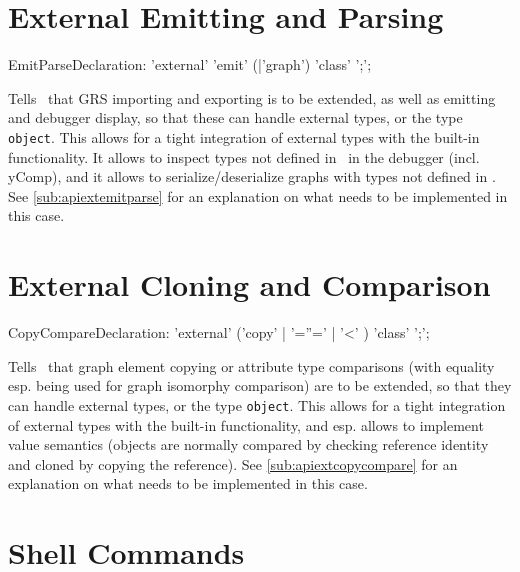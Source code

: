 \section{External Emitting and Parsing}\label{sub:extemitparse}
\begin{rail}
  EmitParseDeclaration: 'external' 'emit' (|'graph') 'class' ';';
\end{rail}
Tells \GrG~that GRS importing and exporting is to be extended, as well as emitting and debugger display, so that these can handle external types, or the type \texttt{object}.
This allows for a tight integration of external types with the built-in functionality.
It allows to inspect types not defined in \GrG~in the debugger (incl. yComp),
and it allows to serialize/deserialize graphs with types not defined in \GrG.
See \ref{sub:apiextemitparse} for an explanation on what needs to be implemented in this case.

\section{External Cloning and Comparison}\label{sub:extcopycompare}
\begin{rail}
  CopyCompareDeclaration: 'external' ('copy' | '=''=' | '<' ) 'class' ';';
\end{rail}
Tells \GrG~that graph element copying or attribute type comparisons (with equality esp. being used for graph isomorphy comparison) are to be extended, so that they can handle external types, or the type \texttt{object}.
This allows for a tight integration of external types with the built-in functionality, 
and esp. allows to implement value semantics (objects are normally compared by checking reference identity and cloned by copying the reference).
See \ref{sub:apiextcopycompare} for an explanation on what needs to be implemented in this case.

\section{Shell Commands}

